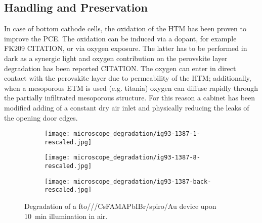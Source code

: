 	\subsection{Handling and Preservation}
		In case of bottom cathode cells, the oxidation of the HTM has been proven to improve the PCE. The oxidation can be induced via a dopant, for example FK209 CITATION, or via oxygen exposure. The latter has to be performed in dark as a synergic light and oxygen contribution on the perovskite layer degradation has been reported CITATION. The oxygen can enter in direct contact with the perovskite layer due to permeability of the HTM; additionally, when a mesoporous ETM is used (e.g. titania) oxygen can diffuse rapidly through the partially infiltrated mesoporous structure. For this reason a cabinet has been modified adding of a constant dry air inlet and physically reducing the leaks of the opening door edges.
				
		\begin{figure}%
			\centering
			\begin{subfigure}[b]{0.45\textwidth}
				\texttt{[image: microscope\_degradation/ig93-1387-1-rescaled.jpg]}
				\label{fig:microscope_degradation-start}
			\end{subfigure}
			\qquad
			\begin{subfigure}[b]{0.45\textwidth}
				\texttt{[image: microscope\_degradation/ig93-1387-8-rescaled.jpg]}
				\label{fig:microscope_degradation-end_front}
			\end{subfigure}
			\bigskip
			
			\begin{subfigure}[b]{0.45\textwidth}
				\texttt{[image: microscope\_degradation/ig93-1387-back-rescaled.jpg]}
				\label{fig:microscope_degradation-end_back}
			\end{subfigure}
			\caption{Degradation of a \gls{fto}/\dTiOtwo/\mpTiOtwo/CsFAMAPbIBr/\gls{spiro}/Au device upon \SI{10}{\minute} illumination in air.}\label{fig:microscope_degradation}
		\end{figure}
	
